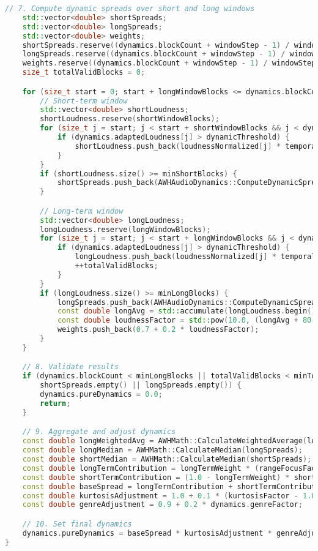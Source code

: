 \documentclass[11pt]{article}
\begin{document}
\begin{lstlisting}[language=C++]
	// 7. Compute dynamic spreads over short and long windows
	std::vector<double> shortSpreads;
	std::vector<double> longSpreads;
	std::vector<double> weights;
	shortSpreads.reserve((dynamics.blockCount + windowStep - 1) / windowStep);
	longSpreads.reserve((dynamics.blockCount + windowStep - 1) / windowStep);
	weights.reserve((dynamics.blockCount + windowStep - 1) / windowStep);
	size_t totalValidBlocks = 0;

	for (size_t start = 0; start + longWindowBlocks <= dynamics.blockCount; start += windowStep) {
		// Short-term window
		std::vector<double> shortLoudness;
		shortLoudness.reserve(shortWindowBlocks);
		for (size_t j = start; j < start + shortWindowBlocks && j < dynamics.blockCount; ++j) {
			if (dynamics.adaptedLoudness[j] > dynamicThreshold) {
				shortLoudness.push_back(loudnessNormalized[j] * temporalWeights[j]);
			}
		}
		if (shortLoudness.size() >= minShortBlocks) {
			shortSpreads.push_back(AWHAudioDynamics::ComputeDynamicSpread(shortLoudness, -INFINITY, iqrFocusFactor, 1.0));
		}

		// Long-term window
		std::vector<double> longLoudness;
		longLoudness.reserve(longWindowBlocks);
		for (size_t j = start; j < start + longWindowBlocks && j < dynamics.blockCount; ++j) {
			if (dynamics.adaptedLoudness[j] > dynamicThreshold) {
				longLoudness.push_back(loudnessNormalized[j] * temporalWeights[j]);
				++totalValidBlocks;
			}
		}
		if (longLoudness.size() >= minLongBlocks) {
			longSpreads.push_back(AWHAudioDynamics::ComputeDynamicSpread(longLoudness, -INFINITY, iqrFocusFactor, 1.0));
			const double longAvg = std::accumulate(longLoudness.begin(), longLoudness.end(), 0.0) / longLoudness.size();
			const double loudnessFactor = std::pow(10.0, (longAvg + 80.0) / 80.0);
			weights.push_back(0.7 + 0.2 * loudnessFactor);
		}
	}

	// 8. Validate results
	if (dynamics.blockCount < minLongBlocks || totalValidBlocks < minTotalBlocks ||
		shortSpreads.empty() || longSpreads.empty()) {
		dynamics.pureDynamics = 0.0;
		return;
	}

	// 9. Aggregate and adjust dynamics
	const double longWeightedAvg = AWHMath::CalculateWeightedAverage(longSpreads, weights);
	const double longMedian = AWHMath::CalculateMedian(longSpreads);
	const double shortMedian = AWHMath::CalculateMedian(shortSpreads);
	const double longTermContribution = longTermWeight * (rangeFocusFactor * longMedian + (1.0 - rangeFocusFactor) * longWeightedAvg);
	const double shortTermContribution = (1.0 - longTermWeight) * shortMedian;
	const double baseSpread = longTermContribution + shortTermContribution;
	const double kurtosisAdjustment = 1.0 + 0.1 * (kurtosisFactor - 1.0);
	const double genreAdjustment = 0.9 + 0.2 * dynamics.genreFactor;

	// 10. Set final dynamics
	dynamics.pureDynamics = baseSpread * kurtosisAdjustment * genreAdjustment;
}
\end{lstlisting}
\end{document}
